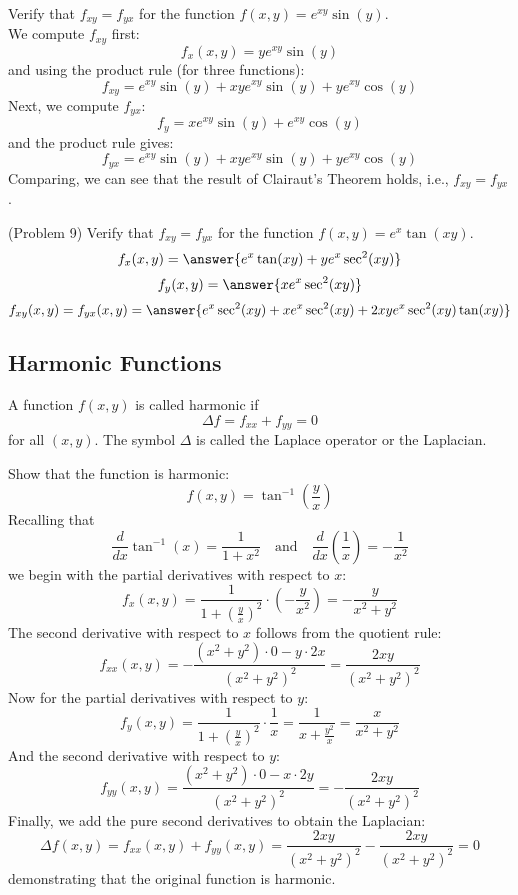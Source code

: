 \documentclass[handout]{ximera}
\begin{document}
\begin{example}[Example 9]
Verify that $f_{xy} = f_{yx}$ for the function $f(x,y) = e^{xy}\sin(y)$.\\
We compute $f_{xy}$ first:
\[
f_x(x,y) = ye^{xy}\sin(y)
\]
and using the product rule (for three functions):
\[
f_{xy} = e^{xy}\sin(y) + xye^{xy}\sin(y) + ye^{xy}\cos(y)
\]
Next, we compute $f_{yx}$:
\[
f_y = xe^{xy}\sin(y) + e^{xy}\cos(y)
\]
and the product rule gives:
\[
f_{yx} = e^{xy}\sin(y) + xy e^{xy}\sin(y) +ye^{xy} \cos(y)
\]
Comparing, we can see that the result of Clairaut's Theorem holds, i.e., $f_{xy} = f_{yx}$.
\end{example}

\begin{problem}(Problem 9)
Verify that $f_{xy} = f_{yx}$ for the function $f(x,y) = e^x\tan(xy)$.\\
\[
f_x(x,y) = \answer{e^x \tan(xy) + ye^x \sec^2(xy)}
\]
\[
f_y(x,y) = \answer{xe^x\sec^2(xy)}
\]
\[
f_{xy}(x,y) = f_{yx}(x,y) = \answer{e^x\sec^2(xy) + xe^x\sec^2(xy) + 2xye^x \sec^2(xy)\tan(xy)}
\]
\end{problem}

\subsection{Harmonic Functions}
\begin{definition}[Harmonic]
A function $f(x,y)$ is called harmonic if 
\[
\Delta f = f_{xx} + f_{yy} = 0
\]
for all $(x,y)$. The symbol $\Delta$ is called the Laplace operator or the Laplacian.
\end{definition}

\begin{example}[Example 10]
Show that the function is harmonic:
\[
f(x,y) = \tan^{-1}\left(\frac{y}{x}\right)
\]
Recalling that 
\[
\frac{d}{dx}\tan^{-1}(x) = \frac{1}{1+x^2} \quad \text{and} \quad \frac{d}{dx} \left(\frac{1}{x}\right) = -\frac{1}{x^2}
\]
we begin with the partial derivatives with respect to $x$:
\[
f_x(x,y) = \frac{1}{1+\left(\frac{y}{x}\right)^2} \cdot \left(-\frac{y}{x^2}\right) = -\frac{y}{x^2 + y^2}
\]
The second derivative with respect to $x$ follows from the quotient rule:
\[
f_{xx}(x,y) = -\frac{(x^2 + y^2) \cdot 0 - y \cdot 2x}{(x^2 + y^2)^2} = \frac{2xy}{(x^2 + y^2)^2}
\]
Now for the partial derivatives with respect to $y$:
\[
f_y(x,y) = \frac{1}{1+\left(\frac{y}{x}\right)^2} \cdot \frac{1}{x} = \frac{1}{x + \frac{y^2}{x}} = \frac{x}{x^2 + y^2}
\]
And the second derivative with respect to $y$:
\[
f_{yy}(x,y) = \frac{(x^2+y^2)\cdot 0 - x \cdot 2y}{(x^2 + y^2)^2} = -\frac{2xy}{(x^2 + y^2)^2}
\]
Finally, we add the pure second derivatives to obtain the Laplacian:
\[
\Delta f(x,y) = f_{xx}(x,y) + f_{yy}(x,y) = \frac{2xy}{(x^2 + y^2)^2}-\frac{2xy}{(x^2 + y^2)^2} =0
\]
demonstrating that the original function is harmonic.
\end{example}
\end{document}
